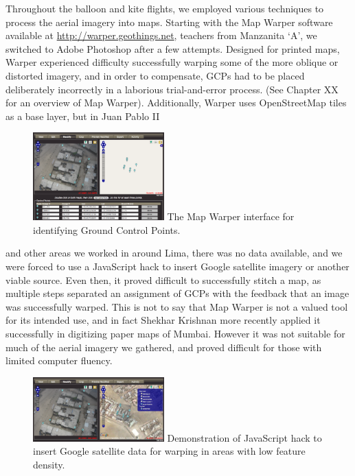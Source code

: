 \documentclass[11pt]{report}
\begin{document}
Throughout the balloon and kite flights, we employed various techniques to process the aerial imagery into maps. Starting with the Map Warper software available at \url{http://warper.geothings.net}, teachers from Manzanita `A', we switched to Adobe Photoshop after a few attempts. Designed for printed maps, Warper experienced difficulty successfully warping some of the more oblique or distorted imagery, and in order to compensate, GCPs had to be placed deliberately incorrectly in a laborious trial-and-error process. (See Chapter XX for an overview of Map Warper). Additionally, Warper uses OpenStreetMap tiles as a base layer, but in Juan Pablo II \begin{figure}
	\begin{flushright}
		\includegraphics[width=0.45\textwidth]{images/map-warper.png}
		The Map Warper interface for identifying Ground Control Points. \cite{waters2009warper}
	\end{flushright}
\end{figure} and other areas we worked in around Lima, there was no data available, and we were forced to use a JavaScript hack to insert Google satellite imagery or another viable source. Even then, it proved difficult to successfully stitch a map, as multiple steps separated an assignment of GCPs with the feedback that an image was successfully warped. This is not to say that Map Warper is not a valued tool for its intended use, and in fact Shekhar Krishnan more recently applied it successfully in digitizing paper maps of Mumbai. However it was not suitable for much of the aerial imagery we gathered, and proved difficult for those with limited computer fluency.

\begin{figure}
	\begin{flushright}
		\includegraphics[width=0.45\textwidth]{images/map-warper-hack.png}
		Demonstration of JavaScript hack to insert Google satellite data for warping in areas with low feature density. \cite{waters2009warper}
	\end{flushright}
\end{figure}
\end{document}
